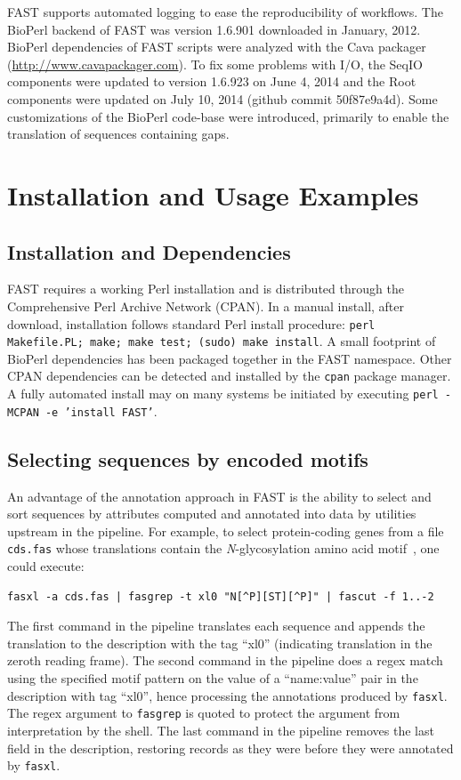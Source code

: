 \documentclass{frontiersSCNS} %
\begin{document}
FAST supports automated logging to ease the reproducibility of
workflows. The BioPerl backend of FAST was version 1.6.901 downloaded in January,
2012. BioPerl dependencies of FAST scripts were analyzed with the Cava
packager (\url{http://www.cavapackager.com}). To fix some problems with
I/O, the SeqIO components were updated to version 1.6.923 on
June 4, 2014 and the Root components were updated on July 10, 2014 (github commit 50f87e9a4d). 
Some customizations of the BioPerl code-base were introduced, primarily 
to enable the translation of sequences containing gaps. 

\section{Installation and Usage Examples}

\subsection{Installation and Dependencies}
FAST requires a working Perl installation and is distributed through
the Comprehensive Perl Archive Network (CPAN). In a manual install,
after download, installation follows standard Perl install procedure:
{\tt perl Makefile.PL; make; make test; (sudo) make install}. A small
footprint of BioPerl dependencies has been packaged together in the
FAST namespace. Other CPAN dependencies can be detected and installed
by the {\tt cpan} package manager. A fully automated install may on
many systems be initiated by executing {\tt perl -MCPAN -e 'install
  FAST'}.

\subsection{Selecting sequences by encoded motifs }

An advantage of the annotation approach in FAST is the ability to
select and sort sequences by attributes computed and annotated into
data by utilities upstream in the pipeline. For example, to select
protein-coding genes from a file {\tt cds.fas} whose translations
contain the {\it N}-glycosylation amino acid
motif~\citep{KornfieldKornfield85}, one could execute:

\begin{verbatim}
fasxl -a cds.fas | fasgrep -t xl0 "N[^P][ST][^P]" | fascut -f 1..-2
\end{verbatim}
 
The first command in the pipeline translates each sequence and appends
the translation to the description with the tag ``xl0'' (indicating
translation in the zeroth reading frame). The second command in the
pipeline does a regex match using the specified motif pattern on the
value of a ``name:value'' pair in the description with tag ``xl0'',
hence processing the annotations produced by {\tt fasxl}. The regex
argument to {\tt fasgrep} is quoted to protect the argument from
interpretation by the shell. The last command in the pipeline removes
the last field in the description, restoring records as they were
before they were annotated by {\tt fasxl}.
\end{document}
